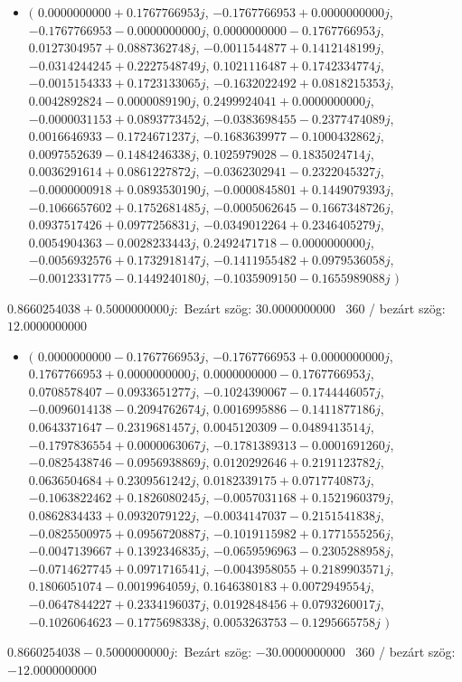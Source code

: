 \documentclass[14pt,a4paper]{article}
\begin{document}
\begin{itemize}
\item
$\big($
$0.0000000000+0.1767766953j$, $-0.1767766953+0.0000000000j$, $-0.1767766953-0.0000000000j$, $0.0000000000-0.1767766953j$, $0.0127304957+0.0887362748j$, $-0.0011544877+0.1412148199j$, $-0.0314244245+0.2227548749j$, $0.1021116487+0.1742334774j$, $-0.0015154333+0.1723133065j$, $-0.1632022492+0.0818215353j$, $0.0042892824-0.0000089190j$, $0.2499924041+0.0000000000j$, $-0.0000031153+0.0893773452j$, $-0.0383698455-0.2377474089j$, $0.0016646933-0.1724671237j$, $-0.1683639977-0.1000432862j$, $0.0097552639-0.1484246338j$, $0.1025979028-0.1835024714j$, $0.0036291614+0.0861227872j$, $-0.0362302941-0.2322045327j$, $-0.0000000918+0.0893530190j$, $-0.0000845801+0.1449079393j$, $-0.1066657602+0.1752681485j$, $-0.0005062645-0.1667348726j$, $0.0937517426+0.0977256831j$, $-0.0349012264+0.2346405279j$, $0.0054904363-0.0028233443j$, $0.2492471718-0.0000000000j$, $-0.0056932576+0.1732918147j$, $-0.1411955482+0.0979536058j$, $-0.0012331775-0.1449240180j$, $-0.1035909150-0.1655989088j$
$\big)$
\end{itemize}
$0.8660254038+0.5000000000j$:\
Bezárt szög: $30.0000000000$ \
360 / bezárt szög: $12.0000000000$\
\begin{itemize}
\item
$\big($
$0.0000000000-0.1767766953j$, $-0.1767766953+0.0000000000j$, $0.1767766953+0.0000000000j$, $0.0000000000-0.1767766953j$, $0.0708578407-0.0933651277j$, $-0.1024390067-0.1744446057j$, $-0.0096014138-0.2094762674j$, $0.0016995886-0.1411877186j$, $0.0643371647-0.2319681457j$, $0.0045120309-0.0489413514j$, $-0.1797836554+0.0000063067j$, $-0.1781389313-0.0001691260j$, $-0.0825438746-0.0956938869j$, $0.0120292646+0.2191123782j$, $0.0636504684+0.2309561242j$, $0.0182339175+0.0717740873j$, $-0.1063822462+0.1826080245j$, $-0.0057031168+0.1521960379j$, $0.0862834433+0.0932079122j$, $-0.0034147037-0.2151541838j$, $-0.0825500975+0.0956720887j$, $-0.1019115982+0.1771555256j$, $-0.0047139667+0.1392346835j$, $-0.0659596963-0.2305288958j$, $-0.0714627745+0.0971716541j$, $-0.0043958055+0.2189903571j$, $0.1806051074-0.0019964059j$, $0.1646380183+0.0072949554j$, $-0.0647844227+0.2334196037j$, $0.0192848456+0.0793260017j$, $-0.1026064623-0.1775698338j$, $0.0053263753-0.1295665758j$
$\big)$
\end{itemize}
$0.8660254038-0.5000000000j$:\
Bezárt szög: $-30.0000000000$ \
360 / bezárt szög: $-12.0000000000$\
\end{document}
